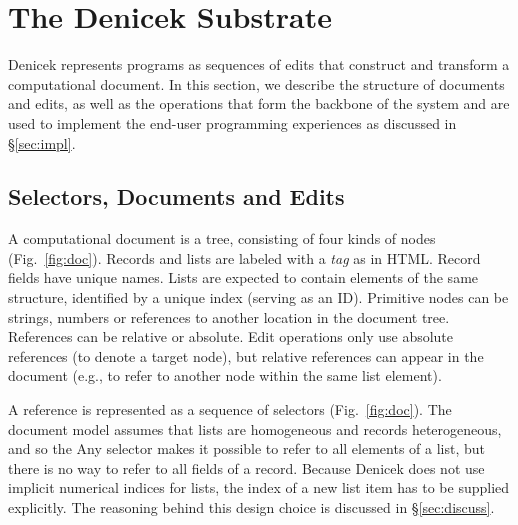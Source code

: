 \documentclass[sigconf]{acmart}
\newcommand{\ident}[1]{{\sffamily #1}}
\begin{document}
\section{The Denicek Substrate}
\label{sec:system}
Denicek represents programs as sequences of edits that construct and transform a computational
document. In this section, we describe the structure of documents and edits, as well as the
operations that form the backbone of the system and are used to implement the
end-user programming experiences as discussed in \S\ref{sec:impl}.


\subsection{Selectors, Documents and Edits}
\label{sec:system-defs}
A computational document is a tree, consisting of four kinds of nodes (Fig.~\ref{fig:doc}).
Records and lists are labeled with a \emph{tag} as in HTML. Record fields have unique names.
Lists are expected to contain elements of the same structure, identified by a unique index (serving
as an ID). Primitive nodes can be strings, numbers or references to another location in the
document tree. References can be relative or absolute. Edit operations only use absolute
references (to denote a target node), but relative references can appear in the document (e.g., to
refer to another node within the same list element).

A reference is represented as a sequence of selectors (Fig.~\ref{fig:doc}).
The document model assumes that lists are homogeneous and records heterogeneous, and so the
\ident{Any} selector makes it possible to refer to all elements of a list, but there is no
way to refer to all fields of a record. Because Denicek does not use implicit numerical
indices for lists, the index of a new list item has to be supplied explicitly. The reasoning behind
this design choice is discussed in \S\ref{sec:discuss}.


\end{document}
